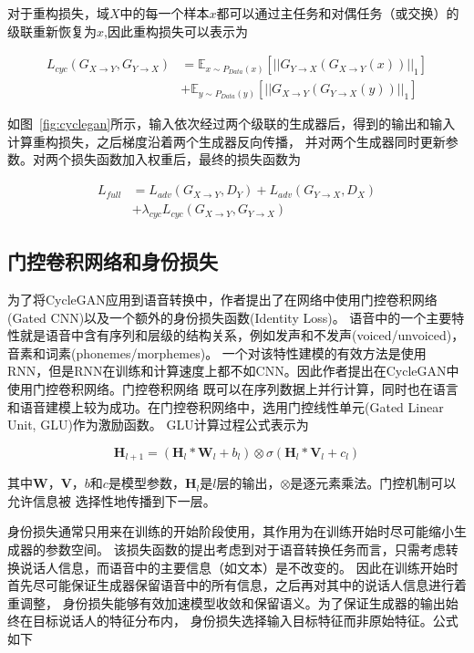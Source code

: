 对于重构损失，域$X$中的每一个样本$x$都可以通过主任务和对偶任务（或交换）的级联重新恢复为$x$,因此重构损失可以表示为

\begin{align}
    L_{cyc}(G_{X\rightarrow Y},G_{Y\rightarrow X}) & = \mathbb{E}_{x\sim P_{Data}(x)}\left[\left| \left| G_{Y\rightarrow X}(G_{X\rightarrow Y}(x))\right| \right|_1 \right] \\
    & + \mathbb{E}_{y\sim P_{Data}(y)}\left[\left| \left| G_{X\rightarrow Y}(G_{Y\rightarrow X}(y))\right| \right|_1 \right]
\end{align}

如图~\ref{fig:cyclegan}所示，输入依次经过两个级联的生成器后，得到的输出和输入计算重构损失，之后梯度沿着两个生成器反向传播，
并对两个生成器同时更新参数。对两个损失函数加入权重后，最终的损失函数为

\begin{align}
    L_{full}& =L_{adv}(G_{X\rightarrow Y},D_Y)+L_{adv}(G_{Y\rightarrow X},D_X)\\
    & +\lambda_{cyc}L_{cyc}(G_{X\rightarrow Y},G_{Y\rightarrow X})
\end{align}

\subsection{门控卷积网络和身份损失}
为了将CycleGAN应用到语音转换中，作者提出了在网络中使用门控卷积网络(Gated CNN)以及一个额外的身份损失函数(Identity Loss)。
语音中的一个主要特性就是语音中含有序列和层级的结构关系，例如发声和不发声(voiced/unvoiced)，音素和词素(phonemes/morphemes)。
一个对该特性建模的有效方法是使用RNN，但是RNN在训练和计算速度上都不如CNN。因此作者提出在CycleGAN中使用门控卷积网络。门控卷积网络
既可以在序列数据上并行计算，同时也在语言和语音建模上较为成功。在门控卷积网络中，选用门控线性单元(Gated Linear Unit, GLU)作为激励函数。
GLU计算过程公式表示为

\begin{equation}
    \mathbf{H}_{l+1}=(\mathbf{H}_l \ast \mathbf{W}_l + b_l)\otimes \sigma (\mathbf{H}_l \ast \mathbf{V}_l + c_l)
\end{equation}

其中$\mathbf{W}$，$\mathbf{V}$，$b$和$c$是模型参数，$\mathbf{H}_l$是$l$层的输出，$\otimes$是逐元素乘法。门控机制可以允许信息被
选择性地传播到下一层。

身份损失通常只用来在训练的开始阶段使用，其作用为在训练开始时尽可能缩小生成器的参数空间。
该损失函数的提出考虑到对于语音转换任务而言，只需考虑转换说话人信息，而语音中的主要信息（如文本）是不改变的。
因此在训练开始时首先尽可能保证生成器保留语音中的所有信息，之后再对其中的说话人信息进行着重调整，
身份损失能够有效加速模型收敛和保留语义。为了保证生成器的输出始终在目标说话人的特征分布内，
身份损失选择输入目标特征而非原始特征。公式如下

